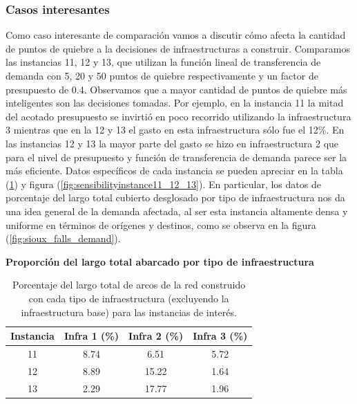 \documentclass{article}
\begin{document}
  \FloatBarrier
  \subsubsection*{Casos interesantes}

  Como caso interesante de comparación vamos a discutir cómo afecta la cantidad de puntos de quiebre a la decisiones de infraestructuras a construir. Comparamos las instancias 11, 12 y 13, que utilizan la función lineal de transferencia de demanda con 5, 20 y 50 puntos de quiebre respectivamente y un factor de presupuesto de 0.4. Observamos que a mayor cantidad de puntos de quiebre más inteligentes son las decisiones tomadas. Por ejemplo, en la instancia 11 la mitad del acotado presupuesto se invirtió en poco recorrido utilizando la infraestructura 3 mientras que en la 12 y 13 el gasto en esta infraestructura sólo fue el 12\%. En las instancias 12 y 13 la mayor parte del gasto se hizo en infraestructura 2 que para el nivel de presupuesto y función de transferencia de demanda parece ser la más eficiente. Datos específicos de cada instancia se pueden apreciar en la tabla (\ref{table:sensibilityinfralengths}) y figura (\ref{fig:sensibilityinstance11_12_13}). En particular, los datos de porcentaje del largo total cubierto desglosado por tipo de infraestructura nos da una idea general de la demanda afectada, al ser esta instancia altamente densa y uniforme en términos de orígenes y destinos, como se observa en la figura (\ref{fig:sioux_falls_demand}).

  \begin{table}[h!]
    \centering
    \caption*{{\bf Proporción del largo total abarcado por tipo de infraestructura}}
    \begin{tabular}{cccc}
      \toprule
        Instancia & Infra 1 (\%) & Infra 2 (\%) & Infra 3 (\%) \\
      \midrule
        11 & 8.74  & 6.51   & 5.72 \\
        12 & 8.89  & 15.22  & 1.64 \\
        13 & 2.29  & 17.77  & 1.96 \\
      \bottomrule
    \end{tabular}
      \caption{Porcentaje del largo total de arcos de la red construido con cada tipo de infraestructura (excluyendo la infraestructura base) para las instancias de interés.}\label{table:sensibilityinfralengths}
  \end{table}
\end{document}
